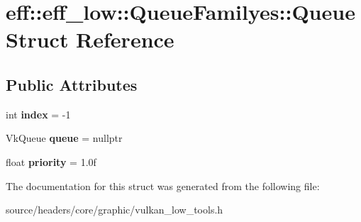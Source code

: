 \hypertarget{structeff_1_1eff__low_1_1QueueFamilyes_1_1Queue}{}\section{eff\+:\+:eff\+\_\+low\+:\+:Queue\+Familyes\+:\+:Queue Struct Reference}
\label{structeff_1_1eff__low_1_1QueueFamilyes_1_1Queue}
\subsection*{Public Attributes}
\begin{DoxyCompactItemize}
\item 
\mbox{\label{structeff_1_1eff__low_1_1QueueFamilyes_1_1Queue_a2da06918add03abc60a1b31c455248b4}} 
int {\bfseries index} = -\/1
\item 
\mbox{\label{structeff_1_1eff__low_1_1QueueFamilyes_1_1Queue_a1f6258ca22ffbe3fb45e2bb10d7fbf7d}} 
Vk\+Queue {\bfseries queue} = nullptr
\item 
\mbox{\label{structeff_1_1eff__low_1_1QueueFamilyes_1_1Queue_a10a6fb9344aa4d2175d734f84f0611fc}} 
float {\bfseries priority} = 1.\+0f
\end{DoxyCompactItemize}


The documentation for this struct was generated from the following file\+:\begin{DoxyCompactItemize}
\item 
source/headers/core/graphic/vulkan\+\_\+low\+\_\+tools.\+h\end{DoxyCompactItemize}
